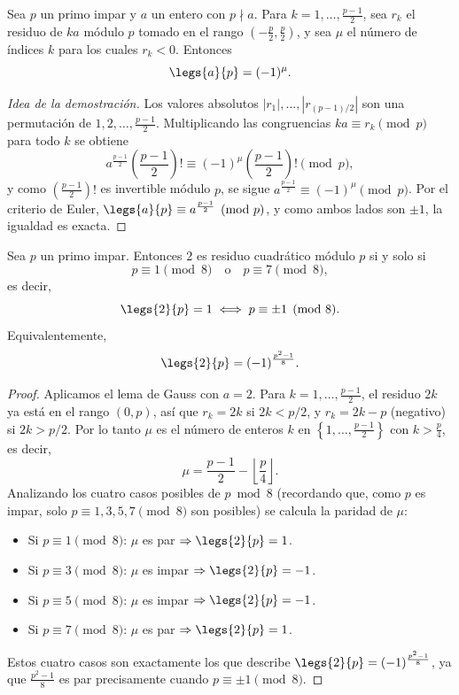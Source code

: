 \begin{lema}
Sea $p$ un primo impar y $a$ un entero con $p \nmid a$. Para $k = 1, \ldots, \frac{p-1}{2}$, sea $r_k$ el residuo de $ka$ módulo $p$ tomado en el rango $\left(-\frac{p}{2}, \frac{p}{2}\right)$, y sea $\mu$ el número de índices $k$ para los cuales $r_k < 0$. Entonces
\[
\legs{a}{p} = (-1)^{\mu}.
\]
\end{lema}
\begin{proof}[Idea de la demostración]
Los valores absolutos $|r_1|, \ldots, |r_{(p-1)/2}|$ son una permutación de $1, 2, \ldots, \frac{p-1}{2}$. Multiplicando las congruencias $ka \equiv r_k \pmod p$ para todo $k$ se obtiene
\[
a^{\frac{p-1}{2}} \left(\frac{p-1}{2}\right)! \equiv (-1)^{\mu} \left(\frac{p-1}{2}\right)! \pmod p,
\]
y como $\left(\frac{p-1}{2}\right)!$ es invertible módulo $p$, se sigue $a^{\frac{p-1}{2}} \equiv (-1)^{\mu} \pmod p$. Por el criterio de Euler, $\legs{a}{p} \equiv a^{\frac{p-1}{2}} \pmod p$, y como ambos lados son $\pm 1$, la igualdad es exacta.
\end{proof}

\begin{teorema}
Sea $p$ un primo impar. Entonces $2$ es residuo cuadrático módulo $p$ si y solo si
\[
p \equiv 1 \pmod 8 \quad \text{o} \quad p \equiv 7 \pmod 8,
\]
es decir,
\[
\legs{2}{p} = 1 \iff p \equiv \pm 1 \pmod 8.
\]
Equivalentemente,
\[
\legs{2}{p} = (-1)^{\frac{p^2-1}{8}}.
\]
\end{teorema}

\begin{proof}
Aplicamos el lema de Gauss con $a = 2$. Para $k = 1, \ldots, \frac{p-1}{2}$, el residuo $2k$ ya está en el rango $(0, p)$, así que $r_k = 2k$ si $2k < p/2$, y $r_k = 2k - p$ (negativo) si $2k > p/2$. Por lo tanto $\mu$ es el número de enteros $k$ en $\left\{1, \ldots, \frac{p-1}{2}\right\}$ con $k > \frac{p}{4}$, es decir,
\[
\mu = \frac{p-1}{2} - \left\lfloor \frac{p}{4} \right\rfloor.
\]
Analizando los cuatro casos posibles de $p \bmod 8$ (recordando que, como $p$ es impar, solo $p \equiv 1,3,5,7 \pmod 8$ son posibles) se calcula la paridad de $\mu$:
\begin{itemize}
  \item Si $p \equiv 1 \pmod 8$: $\mu$ es par $\Rightarrow \legs{2}{p} = 1$.
  \item Si $p \equiv 3 \pmod 8$: $\mu$ es impar $\Rightarrow \legs{2}{p} = -1$.
  \item Si $p \equiv 5 \pmod 8$: $\mu$ es impar $\Rightarrow \legs{2}{p} = -1$.
  \item Si $p \equiv 7 \pmod 8$: $\mu$ es par $\Rightarrow \legs{2}{p} = 1$.
\end{itemize}
Estos cuatro casos son exactamente los que describe $\legs{2}{p} = (-1)^{\frac{p^2-1}{8}}$, ya que $\frac{p^2-1}{8}$ es par precisamente cuando $p \equiv \pm 1 \pmod 8$.
\end{proof}

